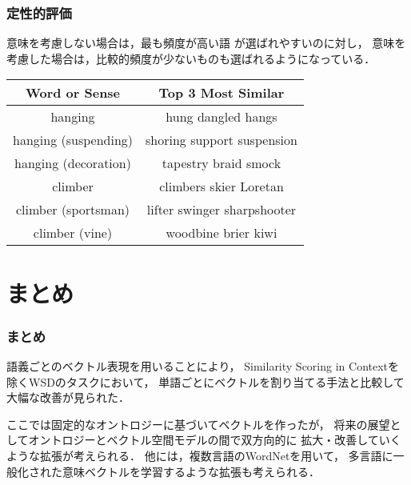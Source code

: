\documentclass[10pt,hyperref={unicode}]{beamer}
\begin{document}
\begin{frame}
\frametitle{定性的評価}
意味を考慮しない場合は，最も頻度が高い語
が選ばれやすいのに対し，
意味を考慮した場合は，比較的頻度が少ないものも選ばれるようになっている．

\bigskip

        \begin{center}
            \begin{algfont}
                {\renewcommand{\arraystretch}{1.5}
                    {\footnotesize
                        \begin{tabular}{|c|c|}
                        \hline
                        Word or Sense        & Top 3 Most Similar          \\
                        \hline
                        hanging              & hung dangled hangs          \\
                        hanging (suspending) & shoring support suspension  \\
                        hanging (decoration) & tapestry braid smock        \\
                        \hline
                        climber              & climbers skier Loretan      \\
                        climber (sportsman)  & lifter swinger sharpshooter \\
                        climber (vine)      & woodbine brier kiwi \\
                        \hline
                        \end{tabular}
                    }
                }
            \end{algfont}
        \end{center}
\end{frame}

\section{まとめ}
\begin{frame}
\frametitle{まとめ}
語義ごとのベクトル表現を用いることにより，
Similarity Scoring in Contextを除くWSDのタスクにおいて，
単語ごとにベクトルを割り当てる手法と比較して大幅な改善が見られた．

\bigskip

ここでは固定的なオントロジーに基づいてベクトルを作ったが，
将来の展望としてオントロジーとベクトル空間モデルの間で双方向的に
拡大・改善していくような拡張が考えられる．
他には，複数言語のWordNetを用いて，
多言語に一般化された意味ベクトルを学習するような拡張も考えられる．
\end{frame}
\end{document}

